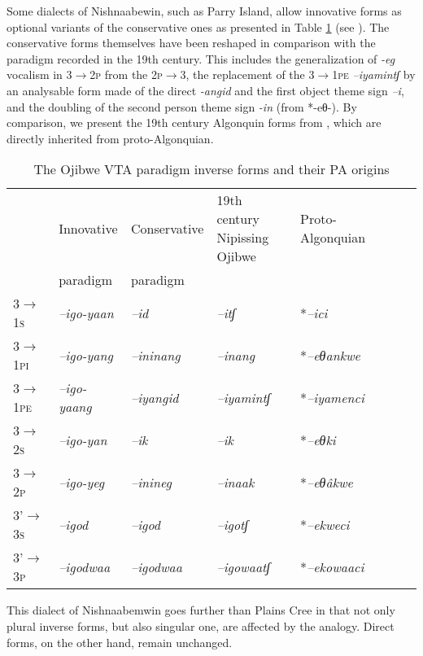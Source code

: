 \documentclass[twoside,a4paper,11pt]{article}
\newcommand{\ipa}[1]{{\phon\textit{#1}}}
\newcommand{\grise}[1]{\cellcolor{lightgray}\textbf{#1}}
\newcommand{\Σ}{\greek{Σ}}
\begin{document}
Some dialects of Nishnaabewin,  such as Parry Island, allow innovative forms as optional variants of the conservative ones as presented in Table \ref{tab:ojibwe.vta.2} (see \citealt[178-9]{valentine01grammar}). The conservative forms themselves have been reshaped in comparison with the paradigm recorded in the 19th century. This includes the generalization of \ipa{-eg} vocalism in \textsc{3$\rightarrow$2p}  from the \textsc{2p$\rightarrow$3}, the replacement of the \textsc{3$\rightarrow$1pe}  \ipa{--iyamintʃ}  by an analysable form made of the direct \ipa{-angid} and the first object theme sign \ipa{--i}, and the doubling of the second person theme sign \ipa{-in} (from *-eθ-). By comparison, we present the 19th century Algonquin forms from \citet[51]{cuoq1866}, which are directly inherited from proto-Algonquian.

\begin{table}[H]
\caption{The Ojibwe VTA paradigm inverse forms and their PA origins}
\centering \label{tab:ojibwe.vta.2}
\begin{tabular}{llllllll}
\toprule
& Innovative & Conservative & 19th century Nipissing Ojibwe & Proto-Algonquian \\
&paradigm & paradigm&\\
\midrule
\textsc{3$\rightarrow$1s} &\ipa{--igo-yaan} \grise{}& 	\ipa{--id} & \ipa{--itʃ} &	 *\ipa{--ici} & 		\\
\textsc{3$\rightarrow$1pi} & 	\ipa{--igo-yang} \grise{}& 	\ipa{--ininang}  \grise{} &  	\ipa{--inang}  	 &*\ipa{--eθankwe} & 		\\
\textsc{3$\rightarrow$1pe} & 	\ipa{--igo-yaang} \grise{}& 	\ipa{--iyangid} \grise{}&	\ipa{--iyamintʃ}  &  *\ipa{--iyamenci} & 		\\
\midrule
\textsc{3$\rightarrow$2s} & 	\ipa{--igo-yan} \grise{}& 	\ipa{--ik} &	\ipa{--ik} &  *\ipa{--eθki} & 		\\
\textsc{3$\rightarrow$2p} & \ipa{--igo-yeg} \grise{}& 	\ipa{--inineg}  \grise{} & \ipa{--inaak}  & *\ipa{--eθâkwe} & 		\\
\midrule
3'\textsc{$\rightarrow$3s} & \ipa{--igod} & 	\ipa{--igod} &		\ipa{--igotʃ} &*\ipa{--ekweci} & 		\\
3'\textsc{$\rightarrow$3p} & \ipa{--igodwaa}   & 	\ipa{--igodwaa}  \grise{}&\ipa{--igowaatʃ} &*\ipa{--ekowaaci} & 		\\
\bottomrule
\end{tabular}
\end{table}

This dialect of Nishnaabemwin goes further than Plains Cree in that not only plural inverse forms, but also singular one, are affected by the analogy. Direct forms, on the other hand, remain unchanged.
\end{document}
